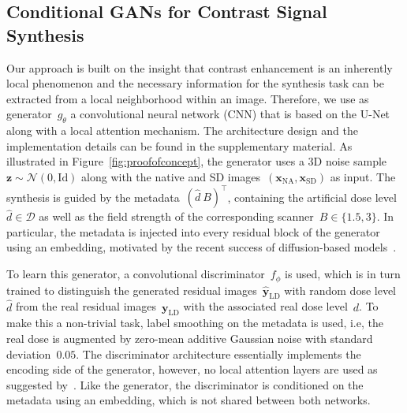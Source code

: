 \documentclass[a4paper,10pt]{article}
\newcommand{\x}{\mathbf{x}}
\newcommand{\y}{\mathbf{y}}
\newcommand{\z}{\mathbf{z}}
\newcommand{\id}{\mathrm{Id}}
\newcommand{\D}{\mathcal{D}}
\newcommand{\N}{\mathcal{N}}
\newcommand{\NA}{\mathrm{NA}}
\newcommand{\LD}{\mathrm{LD}}
\newcommand{\SD}{\mathrm{SD}}
\newcommand{\metad}[2]{\ensuremath{(#1 \ #2)^\top}}
\begin{document}
\subsection{Conditional GANs for Contrast Signal Synthesis}
Our approach is built on the insight that contrast enhancement is an inherently local phenomenon and the necessary information for the synthesis task can be extracted from a local neighborhood within an image.
Therefore, we use as generator~$g_\theta$ a convolutional neural network (CNN) that is based on the U-Net~\cite{RoFi15} along with a local attention mechanism.
The architecture design and the implementation details can be found in the supplementary material.
As illustrated in Figure~\ref{fig:proofofconcept}, the generator uses a 3D noise sample~$\z\sim\N(0,\id)$ along with the native and SD images~$(\x_\NA,\x_\SD)$ as input.
The synthesis is guided by the metadata~$\metad{\hat{d}}{B}$, containing the artificial dose level~$\hat{d}\in\D$ as well as the field strength of the corresponding scanner~$B\in\{1.5,3\}$.
In particular, the metadata is injected into every residual block of the generator using an embedding, motivated by the recent success of diffusion-based models~\cite{HoJa20}.

To learn this generator, a convolutional discriminator~$f_\phi$ is used, which is in turn trained to distinguish the generated residual images~$\hat{\y}_\LD$ with random dose level~$\hat{d}$ from the real residual images~$\y_\LD$ with the associated real dose level~$d$.
To make this a non-trivial task, label smoothing on the metadata is used, i.e, the real dose is augmented by zero-mean additive Gaussian noise with standard deviation~$0.05$.
The discriminator architecture essentially implements the encoding side of the generator, however, no local attention layers are used as suggested by~\cite{LeCh22}.
Like the generator, the discriminator is conditioned on the metadata using an embedding, which is not shared between both networks.
\end{document}
